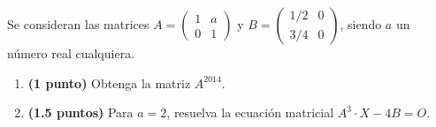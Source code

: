 
Se consideran las matrices $A=\begin{pmatrix}1&a\\0&1\end{pmatrix}$ y $B=\begin{pmatrix}1/2&0\\3/4&0\end{pmatrix}$, siendo $a$ un número real cualquiera.
\begin{enumerate}[label=\alph*)]
\item \textbf{(1 punto)} Obtenga la matriz $A^{2014}$.
\item \textbf{(1.5 puntos)} Para $a=2$, resuelva la ecuación matricial $A^3\cdot X-4B=O$.
\end{enumerate}
